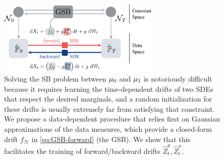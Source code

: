 \begin{figure}[t]
    \centering
    \includegraphics[width=0.7\textwidth]{figures/fig_overview_gsb.pdf}
    \caption{Solving the \acrshort{SB} problem between $\mu_0$ and $\mu_1$ is notoriously difficult because it requires learning the time-dependent drifts of two SDEs that respect the desired marginals, and a random initialization for these drifts is usually extremely far from satisfying that constraint. We propose a data-dependent procedure that relies first on Gaussian approximations of the data measures, which provide a closed-form drift $f_{\mathcal{N}}$ in \eqref{eq:GSB-forward} (the \acrshort{GSB}). We show that this facilitates the training of forward/backward drifts $\hat{Z}^\theta_t, \hat{Z}^\phi_t$.}
    \label{fig:overview_gsbflow}
\end{figure}

